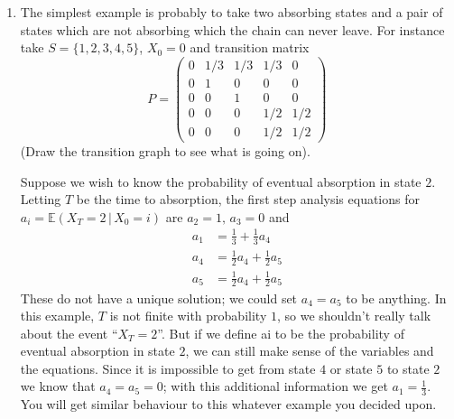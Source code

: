 \documentclass[11pt,a4paper]{report}
\begin{document}
\begin{enumerate}
\begin{enumerate}
        \end{enumerate}
        \item The simplest example is probably to take two absorbing states and a pair of states which are not absorbing which the chain can never leave. For instance take $S =\{1, 2, 3, 4, 5\}$, $X_0 = 0$ and transition matrix
        $$P = \begin{pmatrix}
            0 & 1/3 & 1/3 & 1/3 & 0\\
            0 & 1 & 0 & 0 & 0\\
            0 & 0 & 1 & 0 & 0\\
            0 & 0 & 0 & 1/2 & 1/2\\
            0 & 0 & 0 & 1/2 & 1/2
        \end{pmatrix}$$
        (Draw the transition graph to see what is going on).\par
        Suppose we wish to know the probability of eventual absorption in state $2$. Letting $T$ be the time to absorption, the first step analysis equations for $a_i = \mathbb{E}(X_T = 2\, |\, X_0 = i)$ are $a_2 = 1,\, a_3 = 0$ and
        \begin{align*}
            a_1 &= \frac{1}{3} + \frac{1}{3}a_4\\
            a_4 &= \frac{1}{2}a_4 + \frac{1}{2}a_5\\
            a_5 &= \frac{1}{2}a_4 + \frac{1}{2}a_5
        \end{align*}
        These do not have a unique solution; we could set $a_4 = a_5$ to be anything. In this example, $T$ is not finite with probability $1$, so we shouldn’t really talk about the event “$X_T = 2$”. But if we define ai to be the probability of eventual absorption in state $2$, we can still make sense of the variables and the equations. Since it is impossible to get from state $4$ or state $5$ to state $2$ we know that $a_4 = a_5 = 0$; with this additional information we get $a_1 = \frac{1}{3}$. You will get similar behaviour to this whatever example you decided upon.        
    \end{enumerate}
\end{document}
